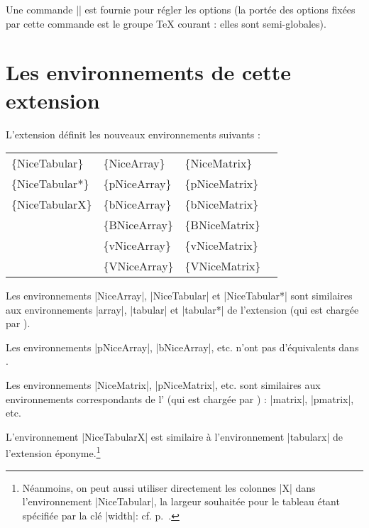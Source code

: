\documentclass[dvipsnames]{article}%
\begin{document}
\medskip
{}
Une commande |\NiceMatrixOptions| est fournie pour régler les options (la portée
des options fixées par cette commande est le groupe TeX courant : elles sont
semi-globales).


\newpage

\section{Les environnements de cette extension}




L'extension  définit les nouveaux environnements suivants :

\medskip
\begin{ttfamily}
\setlength{\tabcolsep}{3mm}
\begin{tabular}{llll}
\{NiceTabular\}  & \{NiceArray\}  & \{NiceMatrix\}   \\
\{NiceTabular*\} & \{pNiceArray\} & \{pNiceMatrix\}  \\
\{NiceTabularX\} & \{bNiceArray\} & \{bNiceMatrix\}  \\
                 & \{BNiceArray\} & \{BNiceMatrix\}  \\
                 & \{vNiceArray\} & \{vNiceMatrix\}  \\
                 & \{VNiceArray\} & \{VNiceMatrix\}
\end{tabular}
\end{ttfamily}


\medskip
Les environnements |{NiceArray}|, |{NiceTabular}| et |{NiceTabular*}| sont
similaires aux environnements |{array}|, |{tabular}| et |{tabular*}| de
l'extension  (qui est chargée par ).


\medskip
Les environnements |{pNiceArray}|, |{bNiceArray}|, etc. n'ont pas d'équivalents
dans .

\medskip
Les environnements |{NiceMatrix}|, |{pNiceMatrix}|, etc. sont similaires aux
environnements correspondants de l' (qui est chargée par
) : |{matrix}|, |{pmatrix}|, etc.

\medskip
L'environnement |{NiceTabularX}| est similaire à l'environnement |{tabularx}| de
l'extension éponyme.\footnote{Néanmoins, on peut aussi utiliser directement les
  colonnes |X| dans l'environnement |{NiceTabular}|, la largeur
  souhaitée pour le tableau étant spécifiée par la clé |width|: cf.
  p.~\pageref{colonne-X}.}
\end{document}
